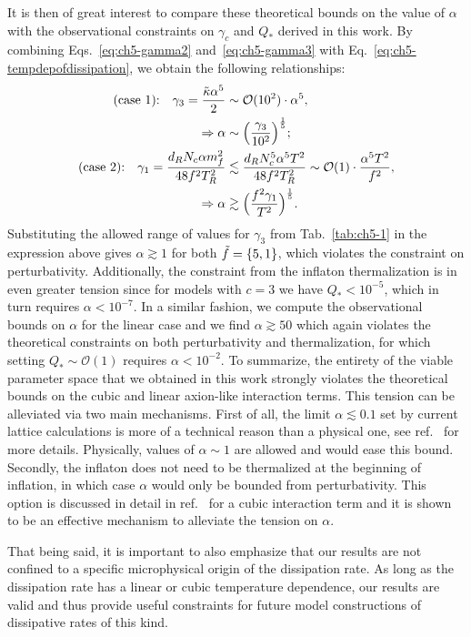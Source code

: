 It is then of great interest to compare these theoretical bounds on the value of $\alpha$ with the observational constraints on $\gamma_c$ and $Q_{*}$ derived in this work. By combining Eqs.~\ref{eq:ch5-gamma2} and~\ref{eq:ch5-gamma3} with Eq.~\ref{eq:ch5-tempdepofdissipation}, we obtain the following relationships:
\begin{align}
    \text{(case 1):} \quad \gamma_3=\frac{\Tilde{\kappa} \alpha^5}{2}&\sim \mathcal{O}(10^2)\cdot \alpha^5, \\
    \Rightarrow \alpha &\sim \Big(\frac{ \gamma_3}{10^2}\Big)^{\frac{1}{5}}; \\
    \text{(case 2):} \quad \gamma_1=\frac{d_R N_c \alpha m_f^2}{48 f^2 T_R^2} &\lesssim \frac{d_R N_c^5 \alpha^5 T^2}{48 f^2 T_R^2} \sim \mathcal{O}(1)\cdot \frac{\alpha^5 T^2}{f^2}, \\
    \Rightarrow \alpha &\gtrsim \Big(\frac{f^2 \gamma_1}{T^2}\Big)^{\frac{1}{5}}. \label{eq:ch5-alpha_2}
\end{align}
Substituting the allowed range of values for $\gamma_3$ from Tab.~\ref{tab:ch5-1} in the expression above gives $\alpha \gtrsim 1$ for both $\Tilde{f}=\{5,1\}$, which violates the constraint on perturbativity. Additionally, the constraint from the inflaton thermalization is in even greater tension since for models with $c=3$ we have $Q_{*}<10^{-5}$, which in turn requires $\alpha<10^{-7}$. In a similar fashion, we compute the observational bounds on $\alpha$ for the linear case and we find $\alpha \gtrsim 50$ which again violates the theoretical constraints on both perturbativity and thermalization, for which setting $Q_{*}\sim \mathcal{O}(1)$ requires $\alpha<10^{-2}$. To summarize, the entirety of the viable parameter space that we obtained in this work strongly violates the theoretical bounds on the cubic and linear axion-like interaction terms. This tension can be alleviated via two main mechanisms. First of all, the limit $\alpha\lesssim 0.1$ set by current lattice calculations is more of a technical reason than a physical one, see ref.~\cite{Moore:2010jd} for more details. Physically, values of $\alpha \sim 1$ are allowed and would ease this bound. Secondly, the inflaton does not need to be thermalized at the beginning of inflation, in which case $\alpha$ would only be bounded from perturbativity. This option is discussed in detail in ref.~\cite{Reyimuaji:2020bkm} for a cubic interaction term and it is shown to be an effective mechanism to alleviate the tension on $\alpha$.

That being said, it is important to also emphasize that our results are not confined to a specific microphysical origin of the dissipation rate. As long as the dissipation rate has a linear or cubic temperature dependence, our results are valid and thus provide useful constraints for future model constructions of dissipative rates of this kind.

